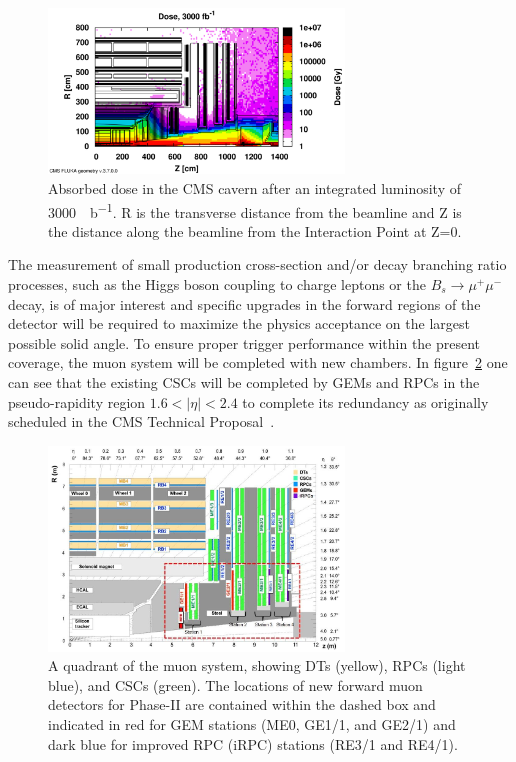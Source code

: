 \begin{figure}[H]
	\centering
	\includegraphics[width=0.7\textwidth]{fig/chapt2/HL-LHC-Dose.png}
	\caption{\label{fig:Dose} Absorbed dose in the CMS cavern after an integrated luminosity of \SI{3000}{\femto\per\barn}. R is the transverse distance from the beamline and Z is the distance along the beamline from the Interaction Point at Z=0.}
\end{figure}

The measurement of small production cross-section and/or decay branching ratio processes, such as the Higgs boson coupling to charge leptons or the $B_s \longrightarrow \mu^+\mu^-$ decay, is of major interest and specific upgrades in the forward regions of the detector will be required to maximize the physics acceptance on the largest possible solid angle. To ensure proper trigger performance within the present coverage, the muon system will be completed with new chambers. In figure~\ref{fig:Quadrant} one can see that the existing \acfp{CSC} will be completed by \acfp{GEM} and \acfp{RPC} in the pseudo-rapidity region $1.6<\vert\eta\vert<2.4$ to complete its redundancy as originally scheduled in the CMS Technical Proposal~\cite{CMSTP}.

\begin{figure}[H]
	\centering
	\includegraphics[width=0.7\textwidth]{fig/chapt2/MuonUpgrade-Plans.jpg}
	\caption{\label{fig:Quadrant} A quadrant of the muon system, showing DTs (yellow), RPCs (light blue), and CSCs (green). The locations of new forward muon detectors for Phase-II are contained within the dashed box and indicated in red for GEM stations (ME0, GE1/1, and GE2/1) and dark blue for improved RPC (iRPC) stations (RE3/1 and RE4/1).}
\end{figure}

